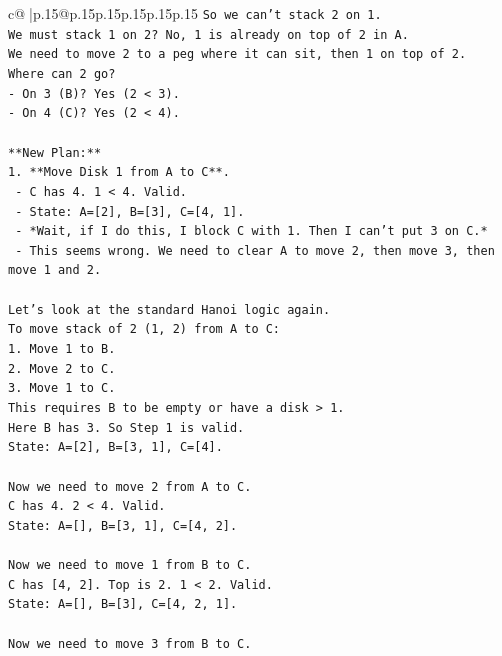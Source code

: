 \documentclass{article}
\begin{document}
{\begin{supertabular}{c@{$\;$}|p{.15\linewidth}@{}p{.15\linewidth}p{.15\linewidth}p{.15\linewidth}p{.15\linewidth}p{.15\linewidth}}
{{{\texttt{So we can't stack 2 on 1.} \\
\texttt{We must stack 1 on 2? No, 1 is already on top of 2 in A.} \\
\texttt{We need to move 2 to a peg where it can sit, then 1 on top of 2.} \\
\texttt{Where can 2 go?} \\
\texttt{{-} On 3 (B)? Yes (2 < 3).} \\
\texttt{{-} On 4 (C)? Yes (2 < 4).} \\
\\ 
\texttt{**New Plan:**} \\
\texttt{1. **Move Disk 1 from A to C**.} \\
\texttt{   {-} C has 4. 1 < 4. Valid.} \\
\texttt{   {-} State: A={[}2{]}, B={[}3{]}, C={[}4, 1{]}.} \\
\texttt{   {-} *Wait, if I do this, I block C with 1. Then I can't put 3 on C.*} \\
\texttt{   {-} This seems wrong. We need to clear A to move 2, then move 3, then move 1 and 2.} \\
\\ 
\texttt{Let's look at the standard Hanoi logic again.} \\
\texttt{To move stack of 2 (1, 2) from A to C:} \\
\texttt{1. Move 1 to B.} \\
\texttt{2. Move 2 to C.} \\
\texttt{3. Move 1 to C.} \\
\texttt{This requires B to be empty or have a disk > 1.} \\
\texttt{Here B has 3. So Step 1 is valid.} \\
\texttt{State: A={[}2{]}, B={[}3, 1{]}, C={[}4{]}.} \\
\\ 
\texttt{Now we need to move 2 from A to C.} \\
\texttt{C has 4. 2 < 4. Valid.} \\
\texttt{State: A={[}{]}, B={[}3, 1{]}, C={[}4, 2{]}.} \\
\\ 
\texttt{Now we need to move 1 from B to C.} \\
\texttt{C has {[}4, 2{]}. Top is 2. 1 < 2. Valid.} \\
\texttt{State: A={[}{]}, B={[}3{]}, C={[}4, 2, 1{]}.} \\
\\ 
\texttt{Now we need to move 3 from B to C.} \\
}}}
\end{supertabular}}
\end{document}
